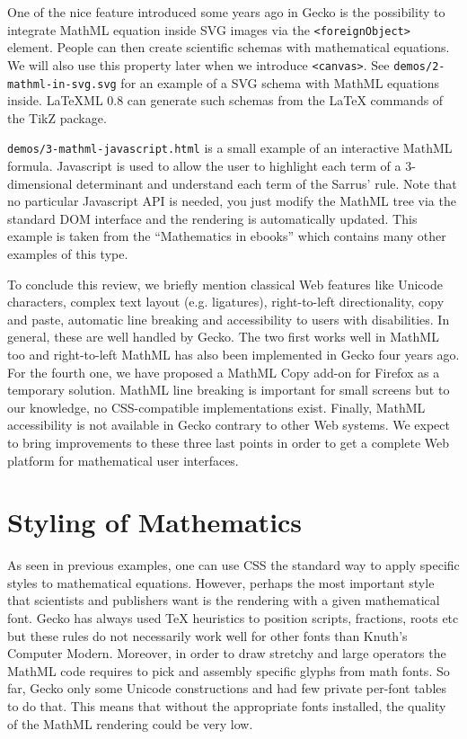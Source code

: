 One of the nice feature introduced some years ago in Gecko is the possibility
to integrate MathML equation inside SVG images via the {\tt <foreignObject>}
element. People can then create
scientific schemas with mathematical equations.
We will also use this property later when we introduce {\tt <canvas>}.
See {\tt demos/2-mathml-in-svg.svg} for an example of a SVG schema with
MathML equations inside. LaTeXML 0.8 can generate
such schemas from the LaTeX commands of the TikZ package.

{\tt demos/3-mathml-javascript.html} is a small example of an
interactive MathML formula. Javascript is used to allow the user to highlight
each term of a 3-dimensional determinant and understand each term of the
Sarrus' rule. Note that no particular Javascript API is needed, you just
modify the MathML tree via the standard DOM interface and the rendering
is automatically updated.
This example is taken from the ``Mathematics in ebooks'' which contains
many other examples of this type.

To conclude this review, we briefly mention classical Web features like
Unicode characters, complex text layout (e.g. ligatures),
right-to-left directionality, copy and paste, automatic line breaking and
accessibility to users with disabilities.
In general, these are well handled by Gecko. The two first
works well in MathML too and right-to-left MathML has also been implemented in
Gecko four years ago. For the fourth one, we have proposed a MathML Copy
add-on for Firefox as a temporary solution. MathML line breaking is important
for small screens but to our knowledge, no CSS-compatible implementations exist.
Finally, MathML accessibility is not available in Gecko contrary to
other Web systems. We expect to
bring improvements to these three last points in order to get a complete Web
platform for mathematical user interfaces.

\section{Styling of Mathematics}

As seen in previous examples, one can use CSS the standard way to apply
specific styles to mathematical equations. However, perhaps the most important
style that scientists and publishers want is the rendering with a given
mathematical font. Gecko has always used TeX heuristics to position scripts,
fractions, roots etc but these rules do not necessarily work well for other
fonts than Knuth's Computer Modern. Moreover, in order to draw stretchy and
large operators the MathML code requires to pick and assembly specific glyphs
from math fonts. So far, Gecko only some Unicode constructions and had
few private per-font tables to do that. This means that without the appropriate
fonts installed, the quality of the MathML rendering could be very low.

